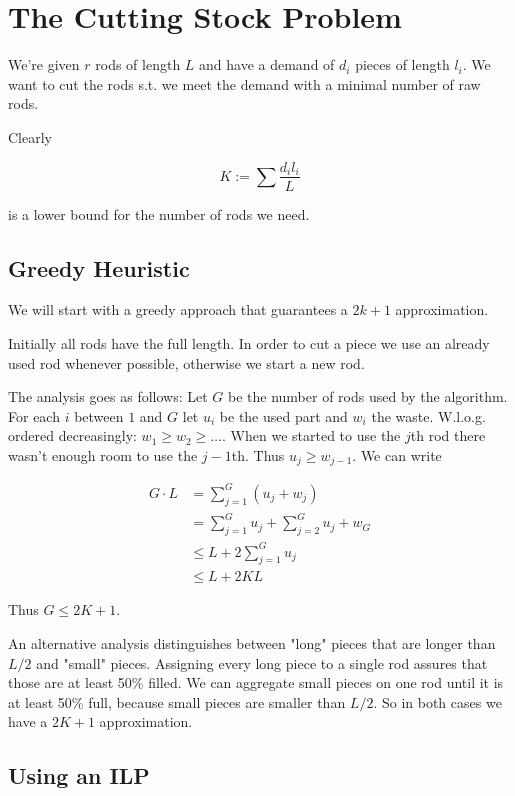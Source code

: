 \section{The Cutting Stock Problem}
We're given $r$ rods of length $L$ and have a demand of $d_i$ pieces of length $l_i$. We want to cut the rods s.t. we meet the demand with a minimal number of raw rods.

Clearly

\[K:=\sum \frac{d_il_i}{L}\]

is a lower bound for the number of rods we need.

\subsection{Greedy Heuristic}

We will start with a greedy approach that guarantees a $2k+1$ approximation.

Initially all rods have the full length. In order to cut a piece we use an already used rod whenever possible, otherwise we start a new rod.

The analysis goes as follows: Let $G$ be the number of rods used by the algorithm. For each $i$ between $1$ and $G$ let $u_i$ be the used part and $w_i$ the waste. W.l.o.g. ordered decreasingly: $w_1\geq w_2\geq \ldots$. When we started to use the $j$th rod there wasn't enough room to use the $j-1$th. Thus $u_j\geq w_{j-1}$. We can write

\begin{align*}
G\cdot L &=  \sum_{j=1}^G (u_j+w_j)\\
	&= \sum_{j=1}^G u_j + \sum_{j=2}^G u_j +w_G\\
	&\leq L+2\sum_{j=1}^G u_j\\
	&\leq L + 2KL
\end{align*}

Thus $G\leq 2K+1$.

An alternative analysis distinguishes between "long" pieces that are longer than $L/2$ and "small" pieces. Assigning every long piece to a single rod assures that those are at least 50\% filled. We can aggregate small pieces on one rod until it is at least 50\% full, because small pieces are smaller than $L/2$. So in both cases we have a $2K+1$ approximation.

\subsection{Using an ILP}

